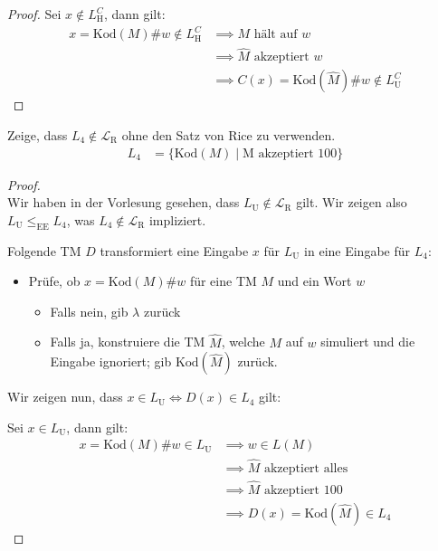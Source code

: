 \documentclass[a4paper,ngerman,12pt]{exam}
\newcommand\kod{\text{Kod}}
\newcommand\Lu{L_{\mathrm{U}}}
\newcommand\Lh{L_{\mathrm{H}}}
\newcommand\LR{\mathcal{L}_{\mathrm{R}}}
\begin{document}
\begin{questions}
\begin{solutionorbox}[22em]
\begin{proof}
        Sei $x \not\in \Lh^C$, dann gilt:
        \begin{align*}
          x = \kod(M)\#w \not\in \Lh^C &\implies M \text{ hält auf } w \\
          &\implies \widehat{M} \text{ akzeptiert } w \\
          &\implies C(x) = \kod(\widehat{M})\#w \not\in \Lu^C
        \end{align*}
      \end{proof}
    \end{solutionorbox}

\ifprintanswers
\newpage
\fi

    \question
    Zeige, dass $L_4 \not\in \LR$ ohne den Satz von Rice zu verwenden.
    \begin{align*}
      L_4 &= \{\kod(M) \mid \text{M akzeptiert } 100\}
    \end{align*}
    \vspace*{-1em}
    \begin{solutionorbox}[22em]
      \begin{proof} $ $ \\
      Wir haben in der Vorlesung gesehen, dass $\Lu \not\in \LR$ gilt. Wir zeigen also
      $\Lu \leq_{\mathrm{EE}} L_4$, was $L_4 \not\in \LR$ impliziert.

      Folgende TM $D$ transformiert eine Eingabe $x$ für $\Lu$ in eine Eingabe für $L_4$:
      \begin{itemize}
        \item Prüfe, ob $x = \kod(M)\#w$ für eine TM $M$ und ein Wort $w$
      \begin{itemize}
        \item Falls nein, gib $\lambda$ zurück
        \item Falls ja, konstruiere die TM $\widehat{M}$, welche $M$ auf $w$ simuliert und
          die Eingabe ignoriert; gib $\kod(\widehat{M})$ zurück.
      \end{itemize}
      \end{itemize}
      Wir zeigen nun, dass $x \in \Lu \iff D(x) \in L_4$ gilt:

        Sei $x \in \Lu$, dann gilt:
        \begin{align*}
          x = \kod(M)\#w \in \Lu &\implies w \in L(M) \\
          &\implies \widehat{M} \text{ akzeptiert alles } \\
          &\implies \widehat{M} \text{ akzeptiert } 100 \\
          &\implies D(x) = \kod(\widehat{M}) \in L_4
        \end{align*}


\end{proof}
\end{solutionorbox}
\end{questions}
\end{document}
